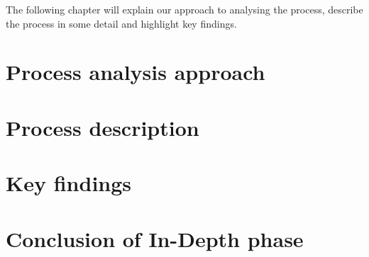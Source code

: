 The following chapter will explain our approach to analysing the process, describe the process in some detail and highlight key findings.

\section{Process analysis approach}

\section{Process description}

\section{Key findings}

\section{Conclusion of In-Depth phase}
